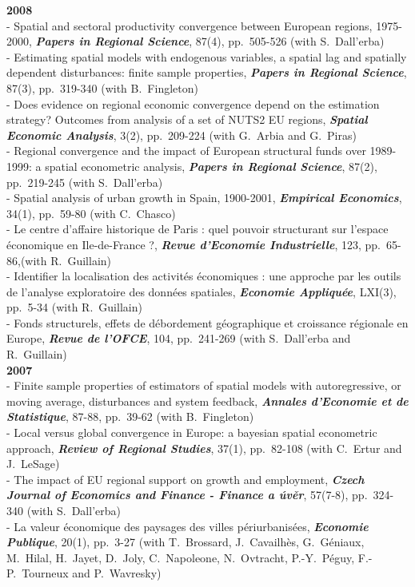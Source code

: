 \documentclass[a4paper,12pt]{article}
\begin{document}
\noindent \textbf{2008}  \smallskip \\ 
- Spatial and sectoral productivity convergence between European regions, 1975-2000, \textit{\textbf{Papers in Regional Science}}, 87(4), pp.~505-526 (with S.~Dall'erba) \\
- Estimating spatial models with endogenous variables, a spatial lag and spatially dependent disturbances: finite sample properties, \textit{\textbf{Papers in Regional Science}}, 87(3), pp.~319-340 (with B.~Fingleton) \\
- Does evidence on regional economic convergence depend on the estimation strategy? Outcomes from analysis of a set of NUTS2 EU regions, \textit{\textbf{Spatial Economic Analysis}}, 3(2), pp.~209-224 (with G.~Arbia and G.~Piras) \\
- Regional convergence and the impact of European structural funds over 1989-1999: a spatial econometric analysis, \textit{\textbf{Papers in Regional Science}}, 87(2), pp.~219-245 (with S.~Dall'erba) \\
- Spatial analysis of urban growth in Spain, 1900-2001, \textit{\textbf{Empirical Economics}}, 34(1), pp.~59-80 (with C.~Chasco) \\
- Le centre d'affaire historique de Paris : quel pouvoir structurant sur l'espace économique en Ile-de-France ?, \textit{\textbf{Revue d'Economie Industrielle}}, 123, pp.~65-86,(with R.~Guillain) \\
- Identifier la localisation des activités économiques : une approche par les outils de l'analyse exploratoire des données spatiales, \textit{\textbf{Economie Appliquée}}, LXI(3), pp.~5-34 (with R.~Guillain) \\
- Fonds structurels, effets de débordement géographique et croissance régionale en Europe, \textit{\textbf{Revue de l'OFCE}}, 104, pp.~241-269 (with S.~Dall'erba and R.~Guillain) \\

\noindent \textbf{2007}  \smallskip \\ 
- Finite sample properties of estimators of spatial models with autoregressive, or moving average, disturbances and system feedback, \textit{\textbf{Annales d'Economie et de Statistique}}, 87-88, pp.~39-62 (with B.~Fingleton) \\
- Local versus global convergence in Europe: a bayesian spatial econometric approach, \textit{\textbf{Review of Regional Studies}}, 37(1), pp.~82-108 (with C.~Ertur and J.~LeSage) \\
- The impact of EU regional support on growth and employment, \textit{\textbf{Czech Journal of Economics and Finance - Finance a úvěr}}, 57(7-8), pp.~324-340 (with S.~Dall'erba) \\
- La valeur économique des paysages des villes périurbanisées, \textit{\textbf{Economie Publique}}, 20(1), pp.~3-27 (with T.~Brossard, J.~Cavailhès, G.~Géniaux, M.~Hilal, H.~Jayet, D.~Joly, C.~Napoleone, N.~Ovtracht, P.-Y.~Péguy, F.-P.~Tourneux and P.~Wavresky) \\
\end{document}
